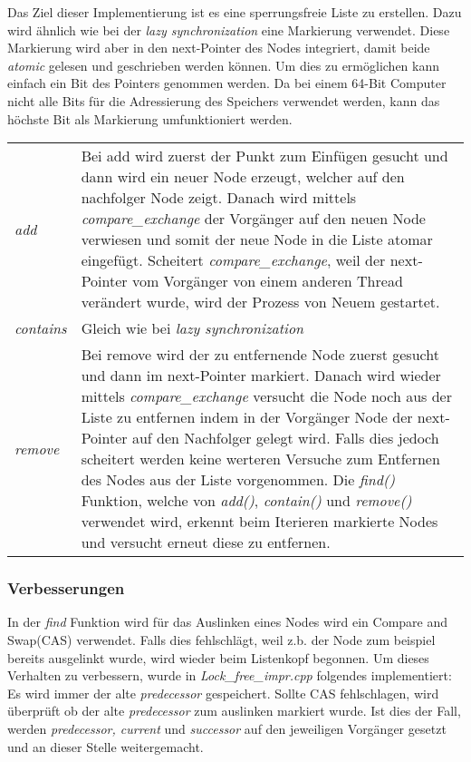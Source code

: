 Das Ziel dieser Implementierung ist es eine sperrungsfreie Liste zu erstellen. Dazu wird ähnlich wie bei der \textit{lazy synchronization} eine Markierung verwendet. 
Diese Markierung wird aber in den next-Pointer des Nodes integriert, damit beide \textit{atomic} gelesen und geschrieben werden können. 
Um dies zu ermöglichen kann einfach ein Bit des Pointers genommen werden. Da bei einem 64-Bit Computer nicht alle Bits für die Adressierung 
des Speichers verwendet werden, kann das höchste Bit als Markierung umfunktioniert werden.

\begin{table}[H]
    \begin{tabularx}{\textwidth}{lX}
		\textit{add} & Bei add wird zuerst der Punkt zum Einfügen gesucht und dann wird ein neuer Node erzeugt, welcher auf den nachfolger Node zeigt. 
		Danach wird mittels \textit{compare\_exchange} der Vorgänger auf den neuen Node verwiesen und somit der neue Node in die Liste atomar eingefügt. 
		Scheitert \textit{compare\_exchange}, weil der next-Pointer vom Vorgänger von einem anderen Thread verändert wurde, wird der Prozess von Neuem gestartet. \\
        \textit{contains} & Gleich wie bei \textit{lazy synchronization} \\
		\textit{remove} & Bei remove wird der zu entfernende Node zuerst gesucht und dann im next-Pointer markiert. 
		Danach wird wieder mittels \textit{compare\_exchange} versucht 
		die Node noch aus der Liste zu entfernen indem in der Vorgänger Node der next-Pointer auf den Nachfolger gelegt wird. Falls dies jedoch scheitert werden 
		keine werteren Versuche zum Entfernen des Nodes aus der Liste vorgenommen. Die \textit{find()} Funktion, welche von \textit{add()}, \textit{contain()} und 
		\textit{remove()} verwendet wird, erkennt beim Iterieren markierte Nodes und versucht erneut diese zu entfernen. \\
    \end{tabularx}
\end{table}

\subsubsection{Verbesserungen}
\label{subsec:impr}
In der \textit{find} Funktion wird für das Auslinken eines Nodes wird ein Compare and Swap(CAS) verwendet. Falls dies fehlschlägt, 
weil z.b. der Node zum beispiel bereits ausgelinkt wurde,
wird wieder beim Listenkopf begonnen. Um dieses Verhalten zu verbessern, wurde in \textit{Lock\_free\_impr.cpp} folgendes implementiert:\\
Es wird immer der alte \textit{predecessor} gespeichert. Sollte CAS fehlschlagen, wird überprüft ob der alte \textit{predecessor}
zum auslinken markiert wurde. Ist dies der Fall, werden \textit{predecessor, current} und \textit{successor} auf den jeweiligen Vorgänger
gesetzt und an dieser Stelle weitergemacht. 